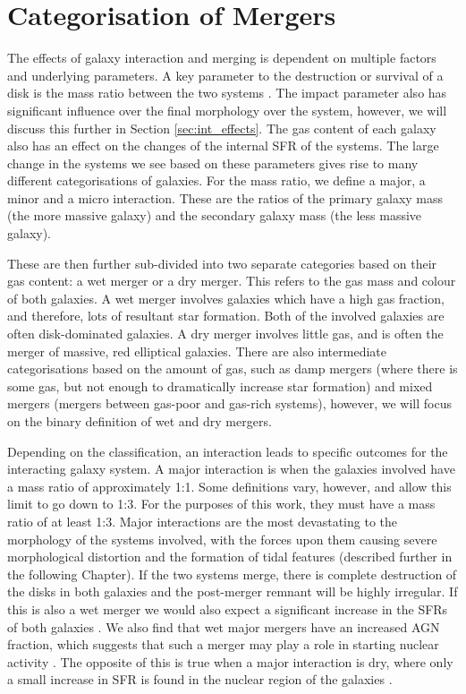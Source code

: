 \section{Categorisation of Mergers}
\noindent The effects of galaxy interaction and merging is dependent on multiple factors and underlying parameters. A key parameter to the destruction or survival of a disk is the mass ratio between the two systems \citep{2005A&A...437...69B, 2008MNRAS.384..386C}. The impact parameter also has significant influence over the final morphology over the system, however, we will discuss this further in Section \ref{sec:int_effects}. The gas content of each galaxy also has an effect on the changes of the internal SFR of the systems. The large change in the systems we see based on these parameters gives rise to many different categorisations of galaxies. For the mass ratio, we define a major, a minor and a micro interaction. These are the ratios of the primary galaxy mass (the more massive galaxy) and the secondary galaxy mass (the less massive galaxy). 

These are then further sub-divided into two separate categories based on their gas content: a wet merger or a dry merger. This refers to the gas mass and colour of both galaxies. A wet merger involves galaxies which have a high gas fraction, and therefore, lots of resultant star formation. Both of the involved galaxies are often disk-dominated galaxies. A dry merger involves little gas, and is often the merger of massive, red elliptical galaxies. There are also intermediate categorisations based on the amount of gas, such as damp mergers (where there is some gas, but not enough to dramatically increase star formation) and mixed mergers (mergers between gas-poor and gas-rich systems), however, we will focus on the binary definition of wet and dry mergers.

Depending on the classification, an interaction leads to specific outcomes for the interacting galaxy system. A major interaction is when the galaxies involved have a mass ratio of approximately 1:1. Some definitions vary, however, and allow this limit to go down to 1:3. For the purposes of this work, they must have a mass ratio of at least 1:3. Major interactions are the most devastating to the morphology of the systems involved, with the forces upon them causing severe morphological distortion and the formation of tidal features (described further in the following Chapter). If the two systems merge, there is complete destruction of the disks in both galaxies and the post-merger remnant will be highly irregular. If this is also a wet merger we would also expect a significant increase in the SFRs of both galaxies \citep{1994ApJ...425L..13M, 1996ApJ...464..641M, 2006AJ....132..197W}. We also find that wet major mergers have an increased AGN fraction, which suggests that such a merger may play a role in starting nuclear activity \citep{2007MNRAS.375.1017A, 2011MNRAS.418.2043E, 2012ApJ...746L..22K}. The opposite of this is true when a major interaction is dry, where only a small increase in SFR is found in the nuclear region of the galaxies \citep{2004ApJ...614..586S, 2006ApJ...640..241B}.

